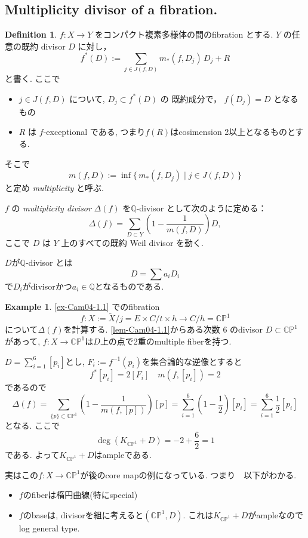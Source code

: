 \documentclass[dvipdfmx,a4paper,11pt]{article} %
\theoremstyle{definition}
\newtheorem{defn}[thm]{Definition}
\newtheorem{ex}[thm]{Example}
\theoremstyle{remark}
\numberwithin{equation}{section}
\newcommand{\C}{\mathbb{C}}
\newcommand{\Q}{\mathbb{Q}}
\begin{document}
\subsection{Multiplicity divisor of a fibration. \cite[1.1.4]{Cam04}}

\begin{defn}
\label{defn-Cam04-1.1.4}
\(f : X \to Y\) をコンパクト複素多様体の間のfibration とする. 
\(Y\) の任意の既約 divisor \(D\) に対し，
\[
f^*(D) := \sum_{j \in J(f,D)} m_*(f,D_j)\, D_j + R
\]
と書く.
ここで 
\begin{itemize}
\item \(j \in J(f,D)\) について,  $D_j \subset f^*(D)$ の 既約成分で，
\(f (D_j) = D\) となるもの
\item \(R\) は \(f\)-exceptional である, つまり$f(R)$はcosimension 2以上となるものとする. 
\end{itemize}
そこで
\[
m(f,D) := \inf\{\,m_*(f,D_j) \mid j \in J(f,D)\,\}
\]
と定め \emph{multiplicity} と呼ぶ. 

 \(f\) の \emph{multiplicity divisor}  \(\Delta(f)\) を\(\mathbb{Q}\)-divisor として次のように定める：
\[
\Delta(f) = \sum_{D \subset Y} \left(1 - \frac{1}{m(f,D)}\right) D,
\]
ここで \(D\) は \(Y\) 上のすべての既約 Weil divisor を動く.
\end{defn}

$D$が\(\mathbb{Q}\)-divisor とは
$$
D = \sum a_i D_i
$$
で$D_i$がdivisorかつ$a_i \in \Q$となるものである. 

\begin{ex}
\ref{ex-Cam04-1.1}
でのfibration 
$$f: X := \tilde{X}/j =E \times C/t \times h\to C/h=\C \mathbb{P}^1 $$
について$\Delta(f) $を計算する. 
\ref{lem-Cam04-1.1}からある次数 6 のdivisor $D \subset \C \mathbb{P}^1$があって, 
$f: X \to \C \mathbb{P}^1 $は$D$上の点で2重のmultiple fiberを持つ.

$D = \sum_{i=1}^{6}[p_i]$とし, $F_i := f^{-1}(p_i)$を集合論的な逆像とすると
$$
f^{*}[p_i] = 2[F_i]
\quad
m(f, [p_i])=2
$$
であるので
$$
\Delta(f) = \sum_{\{p\} \subset \C \mathbb{P}^1} \left(1 - \frac{1}{m(f,[p])}\right) [p]
=\sum_{i=1}^{6}\left(1 - \frac{1}{2}\right)[p_i]
=\sum_{i=1}^{6}\frac{1}{2}[p_i]
$$
となる. 
ここで
$$
\deg(K_{\C\mathbb{P}^1}+ D)
= -2 + \frac{6}{2} = 1
$$
である. よって$K_{\C\mathbb{P}^1}+ D$はampleである. 

実はこの$f : X\to \C\mathbb{P}^1$が後のcore mapの例になっている. 
つまり　以下がわかる. 
\begin{itemize}
\item $f$のfiberは楕円曲線(特にspecial)
\item $f$のbaseは, divisorを組に考えると$(\C\mathbb{P}^1, D)$. これは$K_{\C\mathbb{P}^1}+ D$がampleなのでlog general type. 
\end{itemize}

\end{ex}
\end{document}
